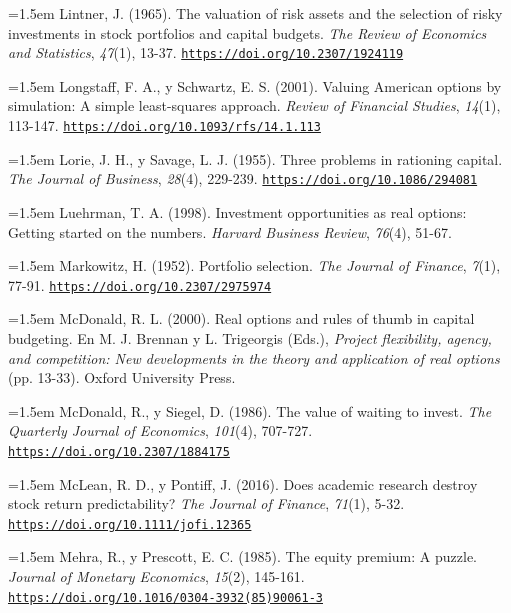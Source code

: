 \documentclass[10pt,a4paper]{article}
\begin{document}
\noindent\hangindent=1.5em Lintner, J. (1965). The valuation of risk assets and the selection of risky investments in stock portfolios and capital budgets. \textit{The Review of Economics and Statistics}, \textit{47}(1), 13-37. \href{https://doi.org/10.2307/1924119}{\nolinkurl{https://doi.org/10.2307/1924119}}

\noindent\hangindent=1.5em Longstaff, F. A., y Schwartz, E. S. (2001). Valuing American options by simulation: A simple least-squares approach. \textit{Review of Financial Studies}, \textit{14}(1), 113-147. \href{https://doi.org/10.1093/rfs/14.1.113}{\nolinkurl{https://doi.org/10.1093/rfs/14.1.113}}

\noindent\hangindent=1.5em Lorie, J. H., y Savage, L. J. (1955). Three problems in rationing capital. \textit{The Journal of Business}, \textit{28}(4), 229-239. \href{https://doi.org/10.1086/294081}{\nolinkurl{https://doi.org/10.1086/294081}}

\noindent\hangindent=1.5em Luehrman, T. A. (1998). Investment opportunities as real options: Getting started on the numbers. \textit{Harvard Business Review}, \textit{76}(4), 51-67.

\noindent\hangindent=1.5em Markowitz, H. (1952). Portfolio selection. \textit{The Journal of Finance}, \textit{7}(1), 77-91. \href{https://doi.org/10.2307/2975974}{\nolinkurl{https://doi.org/10.2307/2975974}}

\noindent\hangindent=1.5em McDonald, R. L. (2000). Real options and rules of thumb in capital budgeting. En M. J. Brennan y L. Trigeorgis (Eds.), \textit{Project flexibility, agency, and competition: New developments in the theory and application of real options} (pp. 13-33). Oxford University Press.

\noindent\hangindent=1.5em McDonald, R., y Siegel, D. (1986). The value of waiting to invest. \textit{The Quarterly Journal of Economics}, \textit{101}(4), 707-727. \href{https://doi.org/10.2307/1884175}{\nolinkurl{https://doi.org/10.2307/1884175}}

\noindent\hangindent=1.5em McLean, R. D., y Pontiff, J. (2016). Does academic research destroy stock return predictability? \textit{The Journal of Finance}, \textit{71}(1), 5-32. \href{https://doi.org/10.1111/jofi.12365}{\nolinkurl{https://doi.org/10.1111/jofi.12365}}

\noindent\hangindent=1.5em Mehra, R., y Prescott, E. C. (1985). The equity premium: A puzzle. \textit{Journal of Monetary Economics}, \textit{15}(2), 145-161. \href{https://doi.org/10.1016/0304-3932(85)90061-3}{\nolinkurl{https://doi.org/10.1016/0304-3932(85)90061-3}}
\end{document}
